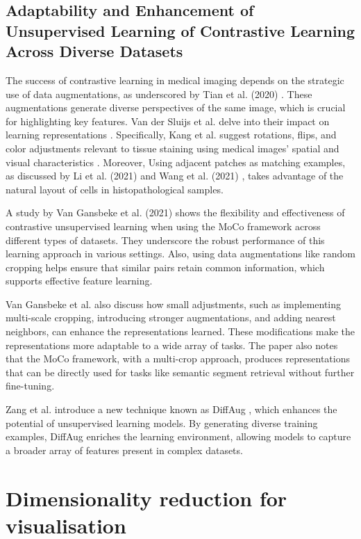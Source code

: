 \subsection{Adaptability and Enhancement of Unsupervised Learning of Contrastive Learning Across Diverse Datasets}

The success of contrastive learning in medical imaging depends on the strategic use of data augmentations, as underscored by Tian et al. (2020) \cite{tian2022understanding}. These augmentations generate diverse perspectives of the same image, which is crucial for highlighting key features. Van der Sluijs et al. delve into their impact on learning representations \cite{van2024exploring}. Specifically, Kang et al. suggest rotations, flips, and color adjustments relevant to tissue staining using medical images' spatial and visual characteristics \cite{kang2023benchmarking}. Moreover, Using adjacent patches as matching examples, as discussed by Li et al. (2021) \cite{li2021dual} and Wang et al. (2021) \cite{wang2021transpath}, takes advantage of the natural layout of cells in histopathological samples.


A study by Van Gansbeke et al. (2021) \cite{van2021revisiting} shows the flexibility and effectiveness of contrastive unsupervised learning when using the MoCo framework across different types of datasets. They underscore the robust performance of this learning approach in various settings. Also, using data augmentations like random cropping helps ensure that similar pairs retain common information, which supports effective feature learning.

Van Gansbeke et al. also discuss how small adjustments, such as implementing multi-scale cropping, introducing stronger augmentations, and adding nearest neighbors, can enhance the representations learned. These modifications make the representations more adaptable to a wide array of tasks. The paper also notes that the MoCo framework, with a multi-crop approach, produces representations that can be directly used for tasks like semantic segment retrieval without further fine-tuning.

Zang et al. introduce a new technique known as DiffAug \cite{zang2023boosting}, which enhances the potential of unsupervised learning models. By generating diverse training examples, DiffAug enriches the learning environment, allowing models to capture a broader array of features present in complex datasets.

\section{Dimensionality reduction for visualisation}

